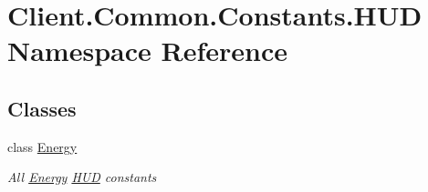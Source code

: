 \hypertarget{namespaceClient_1_1Common_1_1Constants_1_1HUD}{}\section{Client.\+Common.\+Constants.\+H\+U\+D Namespace Reference}
\label{namespaceClient_1_1Common_1_1Constants_1_1HUD}
\subsection*{Classes}
\begin{DoxyCompactItemize}
\item 
class \hyperlink{classClient_1_1Common_1_1Constants_1_1HUD_1_1Energy}{Energy}
\begin{DoxyCompactList}\small\item\em All \hyperlink{classClient_1_1Common_1_1Constants_1_1HUD_1_1Energy}{Energy} \hyperlink{namespaceClient_1_1Common_1_1Constants_1_1HUD}{H\+U\+D} constants \end{DoxyCompactList}\end{DoxyCompactItemize}
